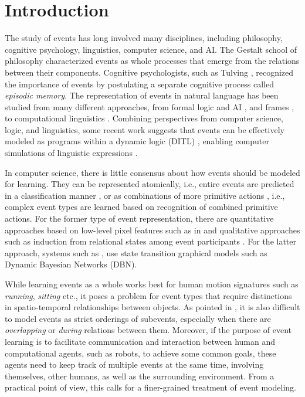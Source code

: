\documentclass{esann}
\begin{document}
\section{Introduction}

The study of events has long involved many disciplines, including philosophy, cognitive psychology, linguistics, computer science, and AI. The Gestalt school of philosophy characterized events as whole processes that emerge from the relations between their components. Cognitive psychologists, such as Tulving \cite{tulving1983elements}, recognized the importance of events by postulating a separate cognitive process called \textit{episodic memory}. The representation of events in natural language has been studied from many different approaches, from formal logic and AI \cite{Allen:1984}, and frames \cite{Fillmore75}, to computational linguistics \cite{TimeML-LRE:2011}. 
Combining perspectives from computer science, logic, and linguistics, some recent work  suggests that events can be effectively modeled  as 
 programs within a dynamic logic (DITL) \cite{pustejovsky2011qualitative}, enabling computer simulations of linguistic expressions  \cite{pustejovsky2014generating}.

In computer science, there is little consensus about how events should be modeled for learning. They can be represented atomically, i.e., entire events are predicted in a classification manner \cite{shahroudy2016ntu}, or as combinations of more primitive actions \cite{veeraraghavan2007learning}, i.e., complex event types are learned based on recognition of combined primitive actions. For the former type of event representation, there are quantitative approaches based on low-level pixel features such as in \cite{le2011learning} and qualitative approaches such as induction from relational states among event participants \cite{dubba2015learning}. For the latter approach, systems such as \cite{hoogs2008video}, use state transition graphical models such as Dynamic Bayesian Networks (DBN). 

While learning events as a whole works best for human motion signatures such as \textit{running}, \textit{sitting} etc., it poses a problem for event types that require distinctions in spatio-temporal relationships between objects. As pointed in \cite{dubba2015learning}, it is also difficult to model events as  strict orderings of subevents, especially when there are \textit{overlapping} or \textit{during} relations between them. Moreover, if the purpose of event learning is to facilitate communication and interaction between human and computational agents, such as robots, to achieve some common goals, these agents need to keep track of multiple events at the same time, involving themselves, other humans, as well as the surrounding environment. From a practical point of view, this calls for a  finer-grained treatment of event modeling.
\end{document}
